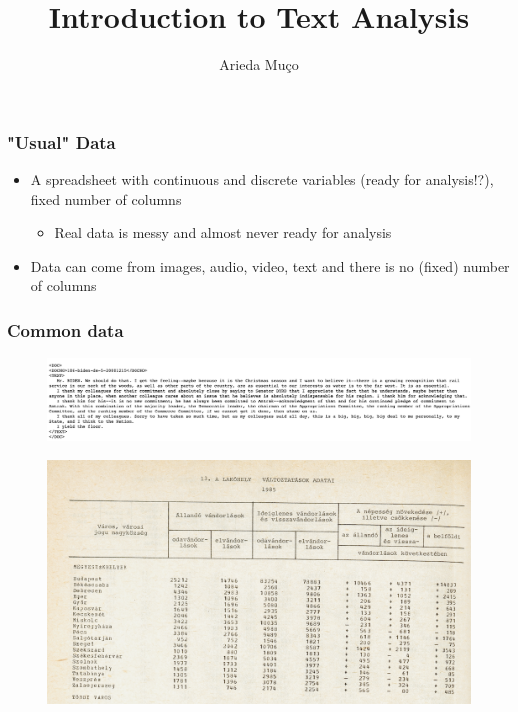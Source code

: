 \documentclass[compress, aspectratio=54]{beamer}
\title[Intro to Text Analysis]{Introduction to Text Analysis}
\author[Arieda Mu\c co]{Arieda Mu\c co}
\institute[CEU]{Central European University}
\date{}
\begin{document}
\captionsetup[subfigure]{labelformat=empty}

\frame{\titlepage}

\begin{frame}
\frametitle{"Usual" Data}
\begin{itemize}
\item A spreadsheet with continuous and discrete variables (ready for analysis!?), fixed number of columns
\begin{itemize}
\item Real data is messy and almost never ready for analysis
\end{itemize}

\item Data can come from images, audio, video, text and there is no (fixed) number of columns

\end{itemize}
\end{frame}

\begin{frame}
\frametitle{Common data}
\begin{figure}

\includegraphics[width=1\linewidth ]{Figures/biden}
\end{figure}
\begin{figure}

\includegraphics[width=0.8\linewidth ]{Figures/ksh-data}
\end{figure}
\end{frame}
\end{document}
